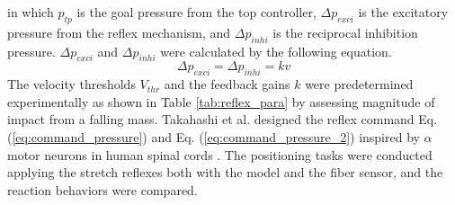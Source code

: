 in which $p_{tp}$ is the goal pressure from the top controller, $\Delta p_{exci}$ is the excitatory pressure from the reflex mechanism, and $ \Delta p_{inhi}$ is the reciprocal inhibition pressure. 
$\Delta p_{exci}$ and $\Delta p_{inhi}$ were calculated by the following equation.
\begin{equation}
    \label{eq:reflex_pressure}
    \Delta p_{exci} =  \Delta p_{inhi} = kv
\end{equation}
The velocity thresholds $V_{thr}$ and the feedback gains $k$ were predetermined experimentally as shown in Table \ref{tab:reflex_para} by assessing magnitude of impact from a falling mass. Takahashi et al. designed the reflex command Eq. (\ref{eq:command_pressure}) and Eq. (\ref{eq:command_pressure_2}) inspired by $\alpha$ motor neurons in human spinal cords \cite{takahashi}. The positioning tasks were conducted applying the stretch reflexes both with the model and the fiber sensor, and the reaction behaviors were compared.
